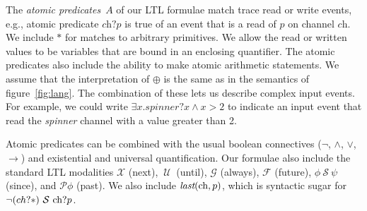 \documentclass{entcs} \usepackage{entcsmacro}
\newcommand{\code}[1]{\text{\lstinline!#1!}}
\newcommand{\sch}{\textit{ch}}
\newcommand{\tnext}{\mathcal{X}}
\newcommand{\talways}{\mathcal{G}}
\newcommand{\tfuture}{\mathcal{F}}
\newcommand{\tuntil}{~\mathcal{U}~}
\newcommand{\tsince}{~\mathcal{S}~}
\newcommand{\tpast}{\mathcal{P}}
\newcommand{\tlast}[2]{\textit{last}(#1, #2)}
\begin{document}
The \emph{atomic predicates}~$A$ of our LTL formulae match trace read
or write events, e.g., atomic predicate $\sch?p$ is true of an event that is a
read of $p$ on channel $\sch$. We include $\ast$ for matches to
arbitrary primitives. We allow the read or written values to be
variables that are bound in an enclosing quantifier. The atomic
predicates also include the ability to make atomic arithmetic
statements.  We assume that the interpretation of $\oplus$ is the same
as in the semantics of figure~\ref{fig:lang}.
The combination of these lets us describe complex input
events. For example, we could write
$\exists x. \textit{spinner}?x \wedge x > 2$ to indicate an input
event that read the \emph{spinner} channel with a value greater than
2.

Atomic predicates can be combined with the usual boolean connectives
($\neg$, $\wedge$, $\vee$, $\rightarrow$) and existential and
universal quantification.  Our formulae also include the standard LTL
modalities $\tnext$ (next), $\tuntil$
(until), $\talways$ (always), $\tfuture$ (future), $\phi \tsince \psi$
(since), and $\tpast \phi$ (past).  We also include
$\tlast{\code{ch}}{p}$, which is syntactic sugar for $\lnot (ch?\ast)
\tsince \code{ch}?p$.
\end{document}

